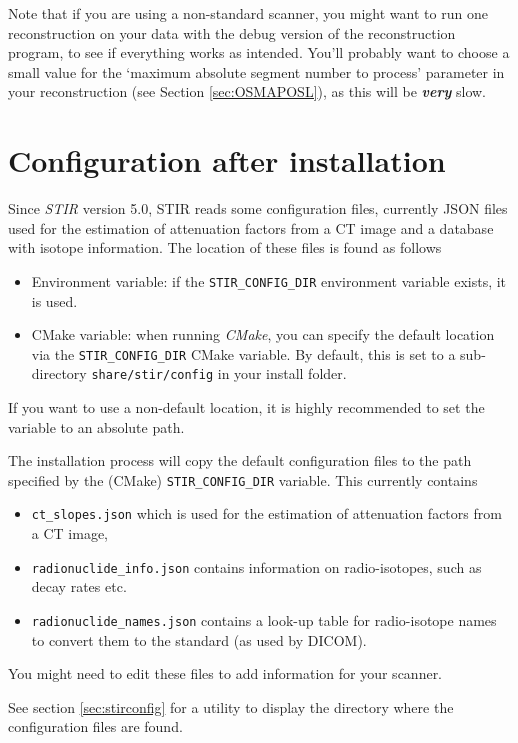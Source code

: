 \documentclass{article}
\begin{document}
Note that if you are using a non-standard scanner, 
you might want to run one reconstruction on your data with 
the debug version of the reconstruction program, to see if everything 
works as intended. You'll probably want to choose a small value 
for the `maximum absolute segment number to process' parameter 
in your reconstruction (see Section \ref{sec:OSMAPOSL}), as this will be \textbf{\textit{very}} 
slow.


\section{Configuration after installation
\label{sec:configuration}
}
Since \textit{STIR} version 5.0, STIR reads some configuration files, currently JSON files used for
the estimation of attenuation factors from a CT image and a database with isotope information.
The location of these files is found as follows
\begin{itemize}
\item Environment variable: if the \texttt{STIR\_CONFIG\_DIR} environment variable exists, it is used.

\item CMake variable: when running \textit{CMake}, you can specify the default location via the
\texttt{STIR\_CONFIG\_DIR} CMake variable. By default, this is set to a sub-directory \texttt{share/stir/config}
in your install folder.
\end{itemize}
If you want to use a non-default location, it is highly recommended to set the variable to an absolute path.

The installation process will copy the default configuration files to the path specified by the
(CMake) \texttt{STIR\_CONFIG\_DIR} variable.
This currently contains
\begin{itemize}
\item \texttt{ct\_slopes.json} which is used for the estimation of attenuation factors from a CT image,
\item \texttt{radionuclide\_info.json} contains information on radio-isotopes, such as decay rates etc.
\item \texttt{radionuclide\_names.json} contains a look-up table for radio-isotope names to convert them
to the standard (as used by DICOM).
\end{itemize}
You might need to edit these files to add information for your scanner.

See section \ref{sec:stirconfig} for a utility to display the directory where the configuration files are found.
\end{document}
